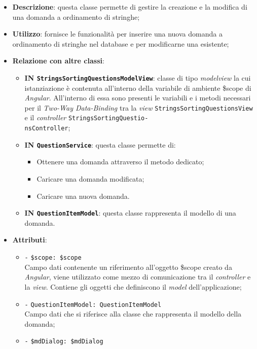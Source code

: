 \begin{itemize}
	\item \textbf{Descrizione}: questa classe permette di gestire la creazione e la modifica di una domanda a ordinamento di stringhe;
	\item \textbf{Utilizzo}: fornisce le funzionalità per inserire una nuova domanda a ordinamento di stringhe nel database e per modificarne una esistente;
	\item \textbf{Relazione con altre classi}:
	\begin{itemize}
		\item \textbf{IN \texttt{StringsSortingQuestionsModelView}}: classe di tipo \textit{modelview } la cui istanziazione è contenuta all'interno della variabile di ambiente \$scope di \textit{Angular}. All'interno di essa sono presenti le variabili e i metodi necessari per il \textit{Two-Way Data-Binding} tra la \textit{view} \texttt{StringsSortingQuestionsView} e il \textit{controller} \texttt{StringsSortingQuestio-\\nsController};
		\item \textbf{IN \texttt{QuestionService}}: questa classe permette di:
		\begin{itemize}
			\item Ottenere una domanda attraverso il metodo dedicato;
			\item Caricare una domanda modificata;
			\item Caricare una nuova domanda.
		\end{itemize}
		\item \textbf{IN \texttt{QuestionItemModel}}: questa classe rappresenta il modello di una domanda.
	\end{itemize}
	\item \textbf{Attributi}:
	\begin{itemize}
		\item \texttt{-} \texttt{\$scope: \$scope} \\
		Campo dati contenente un riferimento all'oggetto \$scope creato da \textit{Angular}, viene utilizzato come mezzo di comunicazione tra il \textit{controller} e la \textit{view}. Contiene gli oggetti che definiscono il \textit{model} dell'applicazione;
		\item \texttt{-} \texttt{QuestionItemModel: QuestionItemModel} \\
		Campo dati che si riferisce alla classe che rappresenta il modello della domanda;
		\item \texttt{-} \texttt{\$mdDialog: \$mdDialog} \\

\end{itemize}
\end{itemize}
